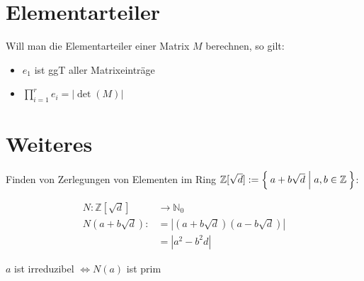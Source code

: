 \documentclass[a4paper,9pt]{scrartcl}
\begin{document}
\section*{Elementarteiler}
Will man die Elementarteiler einer Matrix $M$ berechnen, so gilt:
\begin{itemize}
	\item $e_1$ ist ggT aller Matrixeinträge
	\item $\prod_{i=1}^r e_i = |\det(M)|$
\end{itemize}

\section*{Weiteres}
Finden von Zerlegungen von Elementen im Ring $\mathbb{Z}[\sqrt{d}] := \Set{a + b \sqrt{d} | a, b \in \mathbb{Z}}$:

\begin{align*}
	N:   \mathbb{Z}[\sqrt{d}] &\rightarrow \mathbb{N}_0\\
	N(a+b \sqrt{d}) :&= |(a+b\sqrt{d})(a-b \sqrt{d})|\\
			&= |a^2-b^2 d|
\end{align*}

$a$ ist irreduzibel $\Leftrightarrow N(a)$ ist prim
\end{document}
